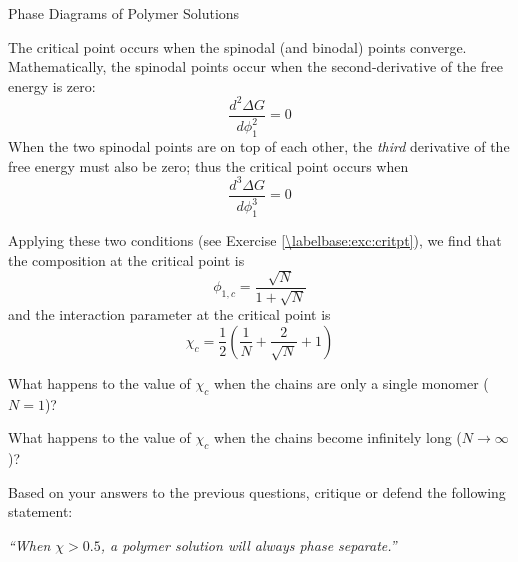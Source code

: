 \begin{activity}{Phase Diagrams of Polymer Solutions}
\begin{infobox}
\label{\labelbase:infobox:critpt}
	
	The critical point occurs when the spinodal (and binodal) points converge.  Mathematically, the spinodal points occur when the second-derivative of the free energy is zero:
	\begin{equation*}
		\frac{d^2\Delta G}{d\phi_1^2} = 0
	\end{equation*}
	When the two spinodal points are on top of each other, the \emph{third} derivative of the free energy must also be zero; thus the critical point occurs when 
	\begin{equation*}
		\frac{d^3\Delta G}{d\phi_1^3} = 0
	\end{equation*}
	
	Applying these two conditions (see Exercise \ref{\labelbase:exc:critpt}), we find that the composition at the critical point is
	\begin{equation*}
		\phi_{1,c} = \frac{\sqrt{N}}{1+\sqrt{N}}
	\end{equation*}
	and the interaction parameter at the critical point is
	\begin{equation*}
		\chi_c = \frac{1}{2}\left(\frac{1}{N} + \frac{2}{\sqrt{N}} + 1\right)
	\end{equation*}
	
\end{infobox}



\begin{ctqs}
	
	\question What happens to the value of $\chi_c$ when the chains are only a single monomer ($N=1$)?
	
		\begin{solution}[0.75in]
		\end{solution}
	
	\question What happens to the value of $\chi_c$ when the chains become infinitely long ($N\to\infty$)?	
	
		\begin{solution}[0.75in]
		\end{solution}
	
	\question Based on your answers to the previous questions, critique or defend the following statement:
	
		\emph{``When $\chi > 0.5$, a polymer solution will always phase separate.'' }
	
		\begin{solution}[2.5in]
		\end{solution}


\end{ctqs}
\end{activity}
